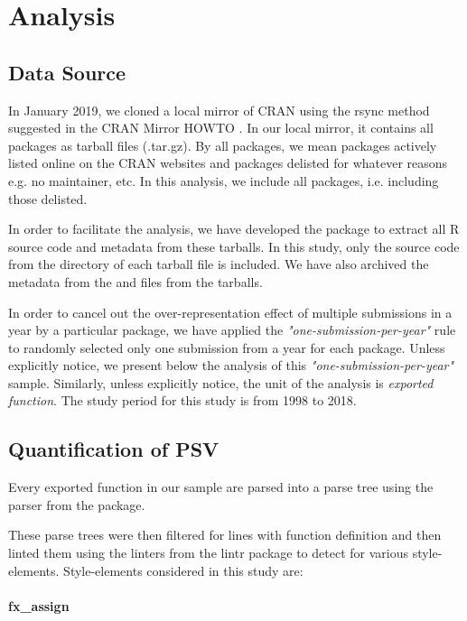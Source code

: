 \section{Analysis}
\subsection{Data Source}

In January 2019, we cloned a local mirror of CRAN using the rsync method suggested in the CRAN Mirror HOWTO \citep{cranminihowto}. In our local mirror, it contains all packages as tarball files (.tar.gz). By all packages, we mean packages actively listed online on the CRAN websites and packages delisted for whatever reasons e.g. no maintainer, etc. In this analysis, we include all packages, i.e. including those delisted.

In order to facilitate the analysis, we have developed the  package to extract all R source code and metadata from these tarballs. In this study, only the source code from the  directory of each tarball file is included. We have also archived the metadata from the  and  files from the tarballs.

In order to cancel out the over-representation effect of multiple submissions in a year by a particular package, we have applied the \emph{"one-submission-per-year"} rule to randomly selected only one submission from a year for each package. Unless explicitly notice, we present below the analysis of this \emph{"one-submission-per-year"} sample. Similarly, unless explicitly notice, the unit of the analysis is \emph{exported function}. The study period for this study is from 1998 to 2018.

\subsection{Quantification of PSV}

Every exported function in our sample are parsed into a parse tree using the parser from the  \citep{lintr} package.

These parse trees were then filtered for lines with function definition and then linted them using the linters from the lintr package to detect for various style-elements. Style-elements considered in this study are:

\paragraph{fx\_assign}


